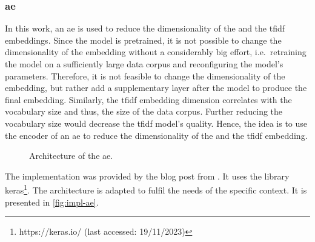 \subsubsection*{\acl{ae}}\label{subsubsec:impl-autoencoder}

In this work, an \ac{ae} is used to reduce the dimensionality of the \infersent{} and the \ac{tfidf} embeddings.
Since the \infersent{} model is pretrained, it is not possible to change the dimensionality of the embedding without a considerably big effort,
i.e.\ retraining the model on a sufficiently large data corpus and reconfiguring the model's parameters.
Therefore, it is not feasible to change the dimensionality of the \infersent{} embedding, but rather add a supplementary layer after the model 
to produce the final embedding.
Similarly, the \ac{tfidf} embedding dimension correlates with the vocabulary size and thus, the size of the data corpus.
Further reducing the vocabulary size would decrease the \ac{tfidf} model's quality.
Hence, the idea is to use the encoder of an \ac{ae} to reduce the dimensionality of the \infersent{} and the \ac{tfidf} embedding.

\begin{figure}[!htb] %
    \centering
    
    \caption[Architecture of the \acs*{ae}]{Architecture of the \acs*{ae}.}
    \label{fig:impl-ae}
\end{figure}

The implementation was provided by the blog post from \cite{impl-src-ae}.
It uses the library keras\footnote{https://keras.io/ (last accessed: 19/11/2023)}.
The architecture is adapted to fulfil the needs of the specific context.
It is presented in \autoref{fig:impl-ae}.